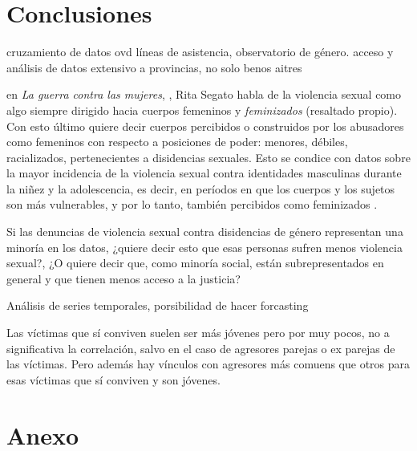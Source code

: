 \documentclass[10 pt]{article}
\begin{document}
\section{Conclusiones}\label{conc}
cruzamiento de datos ovd líneas de asistencia, observatorio de género.
acceso y análisis de datos extensivo a provincias, no solo benos aitres



en \textit{La guerra contra las mujeres}, \citeyearpar{segato2016guerra}, Rita Segato habla de la violencia sexual como algo siempre dirigido hacia cuerpos femeninos y \textit{feminizados} (resaltado propio). Con esto último quiere decir cuerpos percibidos o construidos por los abusadores como femeninos con respecto a posiciones de poder: menores, débiles, racializados, pertenecientes a disidencias sexuales. Esto se condice con datos sobre la mayor incidencia de la violencia sexual contra identidades masculinas durante la niñez y la adolescencia, es decir, en períodos en que los cuerpos y los sujetos son más vulnerables, y por lo tanto, también percibidos como feminizados \citep*{contreras2016violencia,ufem_relevamiento,ferris2002world}.

Si las denuncias de violencia sexual contra disidencias de género representan una minoría en los datos, ¿quiere decir esto que esas personas sufren menos violencia sexual?, ¿O quiere decir que, como minoría social, están subrepresentados en general y que tienen menos acceso a la justicia?



Análisis de series temporales, porsibilidad de hacer forcasting

Las víctimas que sí conviven suelen ser más jóvenes pero por muy pocos, no a significativa la correlación, salvo en el caso de agresores parejas o ex parejas de las víctimas. Pero además hay vínculos con agresores más comuens que otros para esas víctimas que sí conviven y son jóvenes.
\newpage




\newpage
\section{Anexo}\label{anex}
\end{document}
